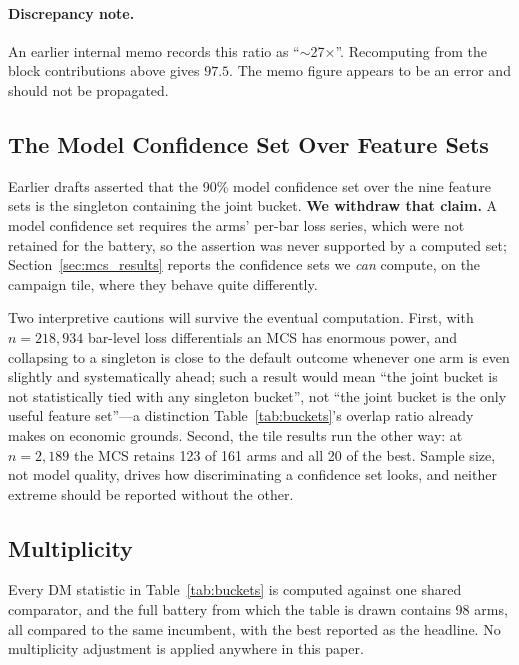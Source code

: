 \paragraph{Discrepancy note.} An earlier internal memo records this ratio as
``$\sim$27$\times$''. Recomputing from the block contributions above gives
$97.5$. The memo figure appears to be an error and should not be propagated.

\subsection{The Model Confidence Set Over Feature Sets}
\label{sec:mcs}

Earlier drafts asserted that the 90\% model confidence set
\citep{HansenLundeNason2011} over the nine feature sets is the singleton
containing the joint bucket. \textbf{We withdraw that claim.} A model
confidence set requires the arms' per-bar loss series, which were not retained
for the battery, so the assertion was never supported by a computed set;
Section~\ref{sec:mcs_results} reports the confidence sets we \emph{can}
compute, on the campaign tile, where they behave quite differently.

Two interpretive cautions will survive the eventual computation. First, with
$n = 218{,}934$ bar-level loss differentials an MCS has enormous power, and
collapsing to a singleton is close to the default outcome whenever one arm is
even slightly and systematically ahead; such a result would mean ``the joint
bucket is not statistically tied with any singleton bucket'', not ``the joint
bucket is the only useful feature set''---a distinction
Table~\ref{tab:buckets}'s overlap ratio already makes on economic grounds.
Second, the tile results run the other way: at $n = 2{,}189$ the MCS retains
123 of 161 arms and all 20 of the best. Sample size, not model quality, drives
how discriminating a confidence set looks, and neither extreme should be
reported without the other.

\subsection{Multiplicity}
\label{sec:multiplicity}

Every DM statistic in Table~\ref{tab:buckets} is computed against one shared
comparator, and the full battery from which the table is drawn contains 98
arms, all compared to the same incumbent, with the best reported as the
headline. No multiplicity adjustment is applied anywhere in this paper.


